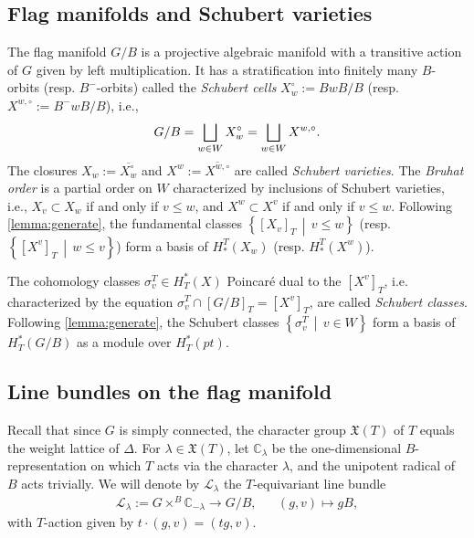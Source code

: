 \documentclass[10pt]{article}
\numberwithin{thm}{section}
\theoremstyle{definition}
\theoremstyle{remark}
\newcommand{\Fl}{\ensuremath{G/B}}
\newcommand{\X}[1]{\ensuremath{\mathfrak X(#1)}}
\newcommand{\IC}{\mathbb C}
\newcommand{\set}[2]{\left\{#1\,\middle\vert\,#2\right\}}
\begin{document}
\subsection{Flag manifolds and Schubert varieties}
\label{sec:Schubert}
The flag manifold $\Fl$ is a projective algebraic manifold 
with a transitive action of $G$ given by left multiplication.
It has a stratification into finitely many $B$-orbits 
(resp. $B^-$-orbits) called the {\em Schubert cells}
$X_w^\circ:= BwB/B$ %
(resp. $X^{w,\circ}:= B^- wB/B $), %
i.e.,
\begin{equation}
\label{schubStrat}
\Fl = \bigsqcup_{w \in W} X_w^\circ =  \bigsqcup_{w \in W} X^{w,\circ} \/. 
\end{equation} 
The closures $X_w:=\overline{X_w^\circ}$ and $X^w:=\overline{X^{w,\circ}}$ are called {\em Schubert varieties}.
The \emph{Bruhat order} is a partial order on $W$ characterized by inclusions of Schubert varieties,
i.e., $X_v \subset X_w$ if and only if $v \le w$,
and $X^w\subset X^v$ if and only if $v\leq w$.
Following \cref{lemma:generate}, the fundamental classes
$\set{[X_v]_T}{v\leq w}$ (resp. $\set{[X^v]_T}{w\leq v}$) form a basis of $H_*^T(X_w)$ (resp. $H_*^T(X^w)$).

The cohomology classes $\sigma_v^T\in H_T^*(X)$ Poincar\'e dual to the $[X^v]_T$,
i.e. characterized by the equation $\sigma_v^T\cap[\Fl]_T=[X^v]_T$,
are called {\em Schubert classes}.
Following \cref{lemma:generate},
the Schubert classes  $\set{\sigma_v^T}{v\in W}$ form a basis of $H_T^*(G/B)$ as a module over $H_T^*(pt)$.

\subsection{Line bundles on the flag manifold}
\label{sec:lineBundles}
Recall that since $G$ is simply connected,
the character group $\X T$ of $T$ equals the weight lattice of $\Delta$.
For $\lambda\in\X T$,
let $\IC_\lambda$ be the one-dimensional $B$-representation on which $T$ acts via the character $\lambda$,
and the unipotent radical of $B$ acts trivially.
We will denote by $\mathcal L_\lambda$ the $T$-equivariant line bundle
\begin{align*}
\mathcal L_\lambda:=G\times^B\IC_{-\lambda}\to G/B,&&(g,v)\mapsto gB,
\end{align*}
with $T$-action given by $t\cdot (g,v)=(tg,v)$.
\end{document}
